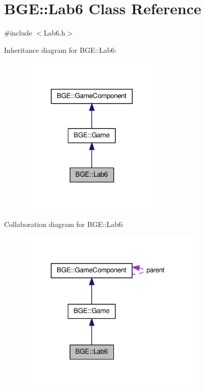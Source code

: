 \hypertarget{class_b_g_e_1_1_lab6}{\section{B\-G\-E\-:\-:Lab6 Class Reference}
\label{class_b_g_e_1_1_lab6}
}


{\ttfamily \#include $<$Lab6.\-h$>$}



Inheritance diagram for B\-G\-E\-:\-:Lab6\-:
\nopagebreak
\begin{figure}[H]
\begin{center}
\leavevmode
\includegraphics[width=200pt]{class_b_g_e_1_1_lab6__inherit__graph}
\end{center}
\end{figure}


Collaboration diagram for B\-G\-E\-:\-:Lab6\-:
\nopagebreak
\begin{figure}[H]
\begin{center}
\leavevmode
\includegraphics[width=249pt]{class_b_g_e_1_1_lab6__coll__graph}
\end{center}
\end{figure}
